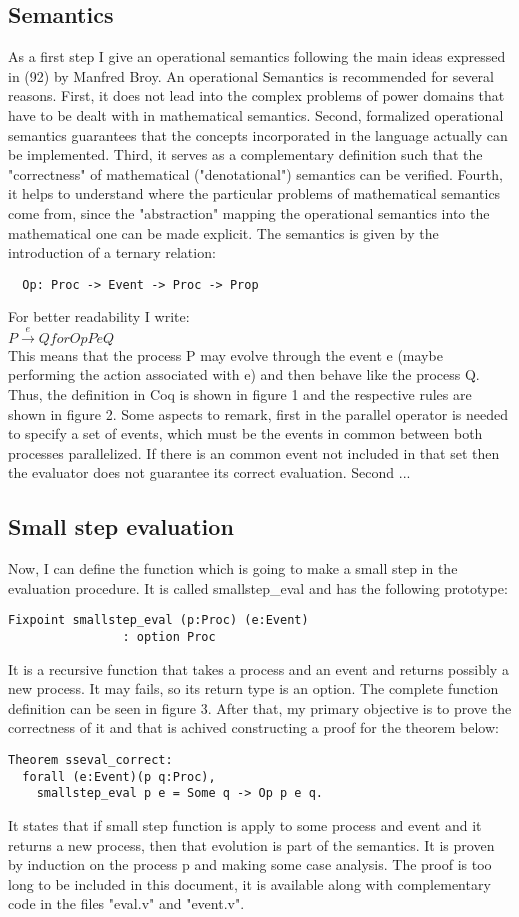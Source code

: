 \documentclass{comjnl}
\begin{document}
\subsection{Semantics}
As a first step I give an operational semantics following the main ideas expressed in (92) by Manfred Broy. An operational Semantics is recommended for several reasons. First, it does not lead into the complex problems of power domains that have to be dealt with in mathematical semantics. Second, formalized operational semantics guarantees that the concepts incorporated in the language actually can be implemented. Third, it serves as a complementary definition such that the "correctness" of mathematical ("denotational") semantics can be verified. Fourth, it helps to understand where the particular problems of mathematical semantics come from, since the "abstraction" mapping the operational semantics into the mathematical one can be made explicit.
The semantics is given by the introduction of a ternary relation:\\
\begin{verbatim}
  Op: Proc -> Event -> Proc -> Prop
\end{verbatim}
For better readability I write:\\
$ P \xrightarrow{e} Q for Op P e Q $\\

This means that the process P may evolve through the event e (maybe performing the action associated with e) and then behave like the process Q.
Thus, the definition in Coq is shown in figure 1 and the respective rules are shown in figure 2.
Some aspects to remark, first in the parallel operator is needed to specify a set of events, which must be the events in common between both processes parallelized. If there is an common event not included in that set then the evaluator does not guarantee its correct evaluation. Second ...
\subsection{Small step evaluation}
Now, I can define the function which is going to make a small step in the evaluation procedure. It is called smallstep\_eval and has the following prototype:
\begin{verbatim}
Fixpoint smallstep_eval (p:Proc) (e:Event)
                : option Proc
\end{verbatim}
It is a recursive function that takes a process and an event and returns possibly a new process. It may fails, so its return type is an option. The complete function definition can be seen in figure 3. After that, my primary objective is to prove the correctness of it and that is achived constructing a proof for the theorem below:
\begin{verbatim}
Theorem sseval_correct: 
  forall (e:Event)(p q:Proc), 
    smallstep_eval p e = Some q -> Op p e q.
\end{verbatim}
It states that if small step function is apply to some process and event and it returns a new process, then that evolution is part of the semantics. It is proven by induction on the process p and making some case analysis. The proof is too long to be included in this document, it is available along with complementary code in the files "eval.v" and "event.v".
\end{document}
